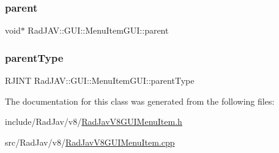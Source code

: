 \subsubsection{\texorpdfstring{parent}{parent}}
{\footnotesize\ttfamily void$\ast$ Rad\+J\+A\+V\+::\+G\+U\+I\+::\+Menu\+Item\+G\+U\+I\+::parent}

\mbox{\label{class_rad_j_a_v_1_1_g_u_i_1_1_menu_item_g_u_i_a1822d606de640f1282579165cfcafd3d}} 
\subsubsection{\texorpdfstring{parent\+Type}{parentType}}
{\footnotesize\ttfamily R\+J\+I\+NT Rad\+J\+A\+V\+::\+G\+U\+I\+::\+Menu\+Item\+G\+U\+I\+::parent\+Type}



The documentation for this class was generated from the following files\+:\begin{DoxyCompactItemize}
\item 
include/\+Rad\+Jav/v8/\mbox{\hyperlink{_rad_jav_v8_g_u_i_menu_item_8h}{Rad\+Jav\+V8\+G\+U\+I\+Menu\+Item.\+h}}\item 
src/\+Rad\+Jav/v8/\mbox{\hyperlink{_rad_jav_v8_g_u_i_menu_item_8cpp}{Rad\+Jav\+V8\+G\+U\+I\+Menu\+Item.\+cpp}}\end{DoxyCompactItemize}
